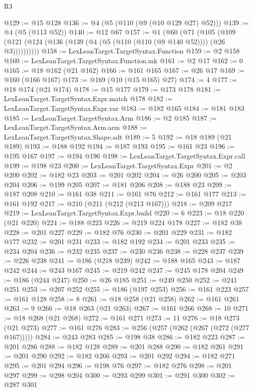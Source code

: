 \begin{lexlean}{R3}
\begin{coremodule}
@129 := @15 @128
@136 := @4 (@5 (@110 (@9 (@10 @129 @27) @52)))
@139 := @4 (@5 (@113 @52))
@140 := @12 @67
@157 := @1
    (@60
      (@71
        (@105 (@109 (@121 (@124 (@136 (@139 (@4 (@5 (@110 (@110 (@9 @140 @52)))) (@26 @3))))))))))
@158 := LexLeanTarget.TargetSyntax.Function
@159 := @2 @158
@160 := LexLeanTarget.TargetSyntax.Function.mk
@161 := @2 @17
@162 := 0
@165 := @18 @162 (@21 @162)
@166 := @161 @165
@167 := @26 @17
@169 := @160 (@166 @167)
@173 := @169 (@10 (@15 @165) @27)
@174 := 4
@177 := @18 @174 (@21 @174)
@178 := @15 @177
@179 := @173 @178
@181 := LexLeanTarget.TargetSyntax.Expr.match @178
@182 := LexLeanTarget.TargetSyntax.Expr.var
@183 := @182 @165
@184 := @181 @183
@185 := LexLeanTarget.TargetSyntax.Arm
@186 := @2 @185
@187 := LexLeanTarget.TargetSyntax.Arm.arm
@188 := LexLeanTarget.TargetSyntax.Shape.adt
@189 := 5
@192 := @18 @189 (@21 @189)
@193 := @188 @192
@194 := @187 @193
@195 := @161 @23
@196 := @195 @167
@197 := @194 @196
@198 := LexLeanTarget.TargetSyntax.Expr.call
@199 := @198 @23
@200 := LexLeanTarget.TargetSyntax.Expr
@201 := @2 @200
@202 := @182 @23
@203 := @201 @202
@204 := @26 @200
@205 := @203 @204
@206 := @199 @205
@207 := @181 @206
@208 := @188 @23
@209 := @187 @208
@210 := @161 @38
@211 := @161 @76
@212 := @161 @177
@213 := @161 @192
@217 := @210 (@211 (@212 (@213 @167)))
@218 := @209 @217
@219 := LexLeanTarget.TargetSyntax.Expr.build
@220 := 6
@223 := @18 @220 (@21 @220)
@224 := @188 @223
@226 := @219 @224 @178
@227 := @182 @38
@228 := @201 @227
@229 := @182 @76
@230 := @201 @229
@231 := @182 @177
@232 := @201 @231
@233 := @182 @192
@234 := @201 @233
@235 := @234 @204
@236 := @232 @235
@237 := @230 @236
@238 := @228 @237
@239 := @226 @238
@241 := @186 (@218 @239)
@242 := @188 @165
@243 := @187 @242
@244 := @243 @167
@245 := @219 @242
@247 := @245 @178 @204
@249 := @186 (@244 @247)
@250 := @26 @185
@251 := @249 @250
@252 := @241 @251
@253 := @207 @252
@255 := @186 (@197 @253)
@256 := @161 @223
@257 := @161 @128
@258 := 8
@261 := @18 @258 (@21 @258)
@262 := @161 @261
@263 := 9
@266 := @18 @263 (@21 @263)
@267 := @161 @266
@268 := 10
@271 := @18 @268 (@21 @268)
@272 := @161 @271
@273 := 11
@276 := @18 @273 (@21 @273)
@277 := @161 @276
@283 := @256 (@257 (@262 (@267 (@272 (@277 @167)))))
@284 := @243 @283
@285 := @198 @38
@286 := @182 @223
@287 := @201 @286
@288 := @182 @128
@289 := @201 @288
@290 := @182 @261
@291 := @201 @290
@292 := @182 @266
@293 := @201 @292
@294 := @182 @271
@295 := @201 @294
@296 := @198 @76
@297 := @182 @276
@298 := @201 @297
@299 := @298 @204
@300 := @293 @299
@301 := @291 @300
@302 := @287 @301

\end{coremodule}
\end{lexlean}
